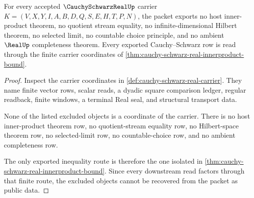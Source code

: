 \begin{theorem}
\label{thm:cauchy-schwarz-real-nonescape}
For every accepted $\CauchySchwarzRealUp$ carrier $K=(V,X,Y,I,A,B,D,Q,S,E,H,T,P,N)$, the packet exports no host inner-product theorem, no quotient stream equality, no infinite-dimensional Hilbert theorem, no selected limit, no countable choice principle, and no ambient $\RealUp$ completeness theorem. Every exported Cauchy--Schwarz row is read through the finite carrier coordinates of \autoref{thm:cauchy-schwarz-real-innerproduct-bound}.
\end{theorem}
\begin{proof}
Inspect the carrier coordinates in \autoref{def:cauchy-schwarz-real-carrier}. They name finite vector rows, scalar reads, a dyadic square comparison ledger, regular readback, finite windows, a terminal Real seal, and structural transport data.

None of the listed excluded objects is a coordinate of the carrier. There is no host inner-product theorem row, no quotient-stream equality row, no Hilbert-space theorem row, no selected-limit row, no countable-choice row, and no ambient completeness row.

The only exported inequality route is therefore the one isolated in \autoref{thm:cauchy-schwarz-real-innerproduct-bound}. Since every downstream read factors through that finite route, the excluded objects cannot be recovered from the packet as public data.
\end{proof}




